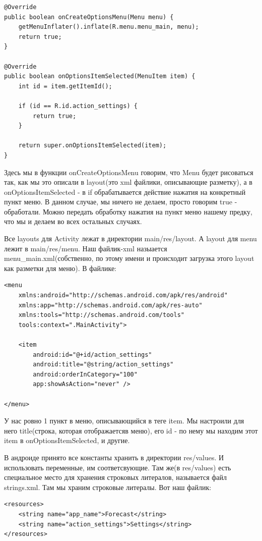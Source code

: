 \documentclass[12 pt]{article}
\begin{document}
    \begin{lstlisting}
@Override
public boolean onCreateOptionsMenu(Menu menu) {
    getMenuInflater().inflate(R.menu.menu_main, menu);
    return true;
}

@Override
public boolean onOptionsItemSelected(MenuItem item) {
    int id = item.getItemId();

    if (id == R.id.action_settings) {
        return true;
    }

    return super.onOptionsItemSelected(item);
}    
    \end{lstlisting} 
    
    Здесь мы в функции onCreateOptionsMenu говорим, что Menu будет рисоваться так, как мы это описали в layout(это xml файлики, описывающие разметку), а в onOptionsItemSelected - в if обрабатывается действие нажатия на конкретный пункт меню. В данном случае, мы ничего не делаем, просто говорим true - обработали. Можно передать обработку нажатия на пункт меню нашему предку, что мы и делаем во всех остальных случаях.
    
    Все layouts для Activity лежат в директории main/res/layout. А layout для menu лежит в main/res/menu. Наш файлик-xml назыается menu\_main.xml(собственно, по этому имени и происходит загрузка этого layout как разметки для меню). В файлике:
    
    \begin{lstlisting}
<menu
    xmlns:android="http://schemas.android.com/apk/res/android"
    xmlns:app="http://schemas.android.com/apk/res-auto"
    xmlns:tools="http://schemas.android.com/tools"
    tools:context=".MainActivity">

    <item
        android:id="@+id/action_settings"
        android:title="@string/action_settings"
        android:orderInCategory="100"
        app:showAsAction="never" />

</menu>    
    \end{lstlisting}
    
    У нас ровно 1 пункт в меню, описывающийся в теге item. Мы настроили для него title(строка, которая отображаетсяв меню), его id - по нему мы находим этот item в onOptionsItemSelected, и другие.
    
    В андроиде принято все константы хранить в директории res/values. И использовать переменные, им соответсвующие. Там же(в res/values) есть специальное место для хранения строковых литералов, называется файл strings.xml. Там мы храним строковые литералы. Вот наш файлик:
    
    \begin{lstlisting}
<resources>
    <string name="app_name">Forecast</string>
    <string name="action_settings">Settings</string>
</resources>   
    \end{lstlisting}
    
\end{document}
